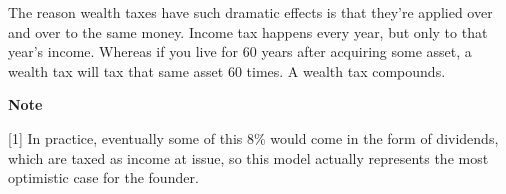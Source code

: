 The reason wealth taxes have such dramatic effects is that they're
applied over and over to the same money. Income tax
happens every year, but only to that year's income. Whereas if you
live for 60 years after acquiring some asset, a wealth tax will tax
that same asset 60 times. A wealth tax compounds.







\textbf{Note}

[1]
In practice, eventually some of this 8\% would come in the form of 
dividends, which are taxed as income at issue, so this model actually
represents the most optimistic case for the founder.






